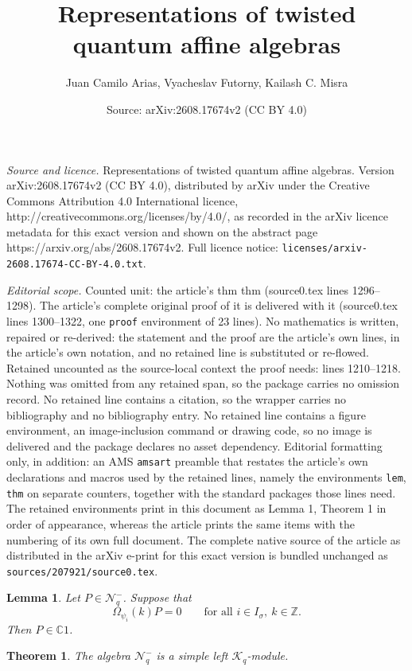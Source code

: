 \documentclass[10pt,a4paper]{amsart}
\title{Representations of twisted quantum affine algebras}
\author{Juan Camilo Arias, Vyacheslav Futorny, Kailash C. Misra}
\date{Source: arXiv:2608.17674v2 (CC BY 4.0)}
\newtheorem{lem}{Lemma}
\newtheorem{thm}{Theorem}
\newcommand{\mc}[1]{\mathcal{#1}}
\begin{document}
\maketitle

\noindent\emph{Source and licence.} Representations of twisted quantum affine algebras. Version arXiv:2608.17674v2 (CC BY 4.0), distributed by arXiv under the Creative Commons Attribution 4.0 International licence, http://creativecommons.org/licenses/by/4.0/, as recorded in the arXiv licence metadata for this exact version and shown on the abstract page https://arxiv.org/abs/2608.17674v2. Full licence notice: \texttt{licenses/arxiv-2608.17674-CC-BY-4.0.txt}.\par\smallskip

\noindent\textit{Editorial scope.} Counted unit: the article's thm thm (source0.tex lines 1296--1298). The article's complete original proof of it is delivered with it (source0.tex lines 1300--1322, one \texttt{proof} environment of 23 lines). No mathematics is written, repaired or re-derived: the statement and the proof are the article's own lines, in the article's own notation, and no retained line is substituted or re-flowed.  Retained uncounted as the source-local context the proof needs: lines 1210--1218.  Nothing was omitted from any retained span, so the package carries no omission record.  No retained line contains a citation, so the wrapper carries no bibliography and no bibliography entry.  No retained line contains a figure environment, an image-inclusion command or drawing code, so no image is delivered and the package declares no asset dependency.  Editorial formatting only, in addition: an AMS \texttt{amsart} preamble that restates the article's own declarations and macros used by the retained lines, namely the environments \texttt{lem}, \texttt{thm} on separate counters, together with the standard packages those lines need.  The retained environments print in this document as Lemma 1, Theorem 1 in order of appearance, whereas the article prints the same items with the numbering of its own full document.  The complete native source of the article as distributed in the arXiv e-print for this exact version is bundled unchanged as \texttt{sources/207921/source0.tex}.
\begin{lem}\label{lem:Omega-invariant}
Let $P\in\mc N_q^-$. Suppose that
\[
\Omega_{\psi_i}(k)P=0
\qquad
\text{for all }i\in I_\sigma,\ k\in\mathbb Z.
\]
Then $P\in\mathbb C1$.
\end{lem}

\begin{thm}
The algebra $\mc{N}_q^-$ is a simple left $\mc{K}_q$-module.
\end{thm}
\end{document}
